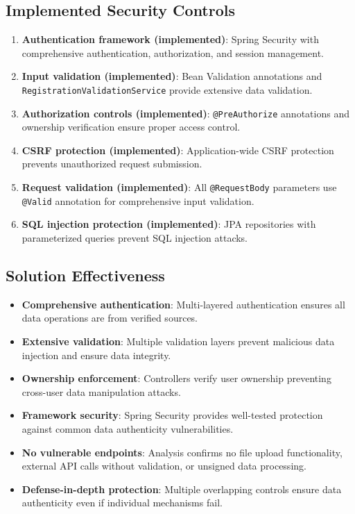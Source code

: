 \documentclass[]{UCD_CS_FYP_Report}
\begin{document}
\subsection{Implemented Security Controls}
\begin{enumerate}
	\item \textbf{Authentication framework (implemented)}: Spring Security with comprehensive authentication, authorization, and session management.
	\item \textbf{Input validation (implemented)}: Bean Validation annotations and \texttt{RegistrationValidationService} provide extensive data validation.
	\item \textbf{Authorization controls (implemented)}: \texttt{@PreAuthorize} annotations and ownership verification ensure proper access control.
	\item \textbf{CSRF protection (implemented)}: Application-wide CSRF protection prevents unauthorized request submission.
	\item \textbf{Request validation (implemented)}: All \texttt{@RequestBody} parameters use \texttt{@Valid} annotation for comprehensive input validation.
	\item \textbf{SQL injection protection (implemented)}: JPA repositories with parameterized queries prevent SQL injection attacks.
\end{enumerate}

\subsection{Solution Effectiveness}
\begin{itemize}
	\item \textbf{Comprehensive authentication}: Multi-layered authentication ensures all data operations are from verified sources.
	\item \textbf{Extensive validation}: Multiple validation layers prevent malicious data injection and ensure data integrity.
	\item \textbf{Ownership enforcement}: Controllers verify user ownership preventing cross-user data manipulation attacks.
	\item \textbf{Framework security}: Spring Security provides well-tested protection against common data authenticity vulnerabilities.
	\item \textbf{No vulnerable endpoints}: Analysis confirms no file upload functionality, external API calls without validation, or unsigned data processing.
	\item \textbf{Defense-in-depth protection}: Multiple overlapping controls ensure data authenticity even if individual mechanisms fail.
\end{itemize}
\end{document}
